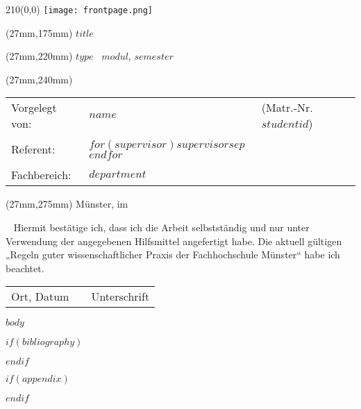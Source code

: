 \documentclass[10 pt,bibliography=totoc]{scrreprt}
\begin{document}
\begin{titlepage}
\begin{textblock}{210}(0,0)
	\texttt{[image: frontpage.png]}
\end{textblock}
\doublespacing
\begin{textblock*}{156mm}(27mm,175mm)
	\LARGE \textbf{$title$}
\end{textblock*}
\singlespacing
\begin{textblock*}{156mm}(27mm,220mm)
	\Large $type$ \ \textbf{$modul$}, $semester$
\end{textblock*}
\begin{textblock*}{156mm}(27mm,240mm)
	\normalsize
	\begin{tabularx}{156mm}{l l X}
		Vorgelegt von:&\textbf{$name$}&(Matr.-Nr. $studentid$)\\
		&&\\
		Referent:&\textbf{$for(supervisor)$$supervisor$$sep$ \newline $endfor$}\\
		&&\\
		Fachbereich:&\textbf{$department$}\\
	\end{tabularx}
\end{textblock*}
\begin{textblock*}{156mm}(27mm,275mm)
	Münster, im \makeatletter \month@ngerman \makeatother \ \the\year
\end{textblock*}
\end{titlepage}
\clearpage
\newpage
\mbox{~}
\clearpage
\newpage
\thispagestyle{empty}
\vspace*{10mm}
\normalsize
\doublespacing
Hiermit bestätige ich, dass ich die Arbeit selbstständig und nur unter Verwendung der angegebenen Hilfsmittel angefertigt habe. Die aktuell gültigen „Regeln guter wissenschaftlicher Praxis der Fachhochschule Münster“ habe ich beachtet.
\vspace{20mm}
\hspace{-1cm}
\begin{table}[h]
	\centering
	\begin{tabular}{p{50mm}p{50mm}p{50mm}}
		Ort, Datum& &Unterschrift
	\end{tabular}
\end{table}
\newpage

\tableofcontents
\listoffigures
\listoftables

$body$

$if(bibliography)$


$endif$


$if(appendix)$

$endif$
\end{document}

